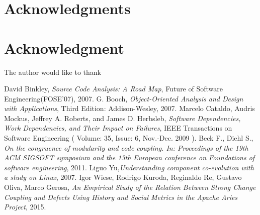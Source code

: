 \documentclass[conference,compsoc]{IEEEtran}
\begin{document}
\ifCLASSOPTIONcompsoc
  \section*{Acknowledgments}
\else
  \section*{Acknowledgment}
\fi


The author would like to thank 



\begin{thebibliography}{1}

David Binkley, \emph{Source Code Analysis: A Road Map}, Future of Software Engineering(FOSE'07), 2007.
G. Booch, \emph{Object-Oriented Analysis and Design with Applications}, Third Edition: Addison-Wesley, 2007.
Marcelo Cataldo, Audris Mockus, Jeffrey A. Roberts, and James D. Herbsleb, \emph{Software Dependencies, Work Dependencies, and Their Impact on Failures},  IEEE Transactions on Software Engineering ( Volume: 35, Issue: 6, Nov.-Dec. 2009 ).
Beck F., Diehl S.,\emph{ On the congruence of modularity and code coupling. In: Proceedings of the 19th ACM SIGSOFT symposium and the 13th European conference on Foundations of software engineering}, 2011.
Liguo Yu,\emph{Understanding component co-evolution with a study on Linux}, 2007.
Igor Wiese, Rodrigo Kuroda, Reginaldo Re, Gustavo Oliva, Marco Gerosa, \emph{An Empirical Study of the Relation Between Strong Change Coupling and Defects Using History and Social Metrics in the Apache Aries Project}, 2015.
\end{thebibliography}
\end{document}
